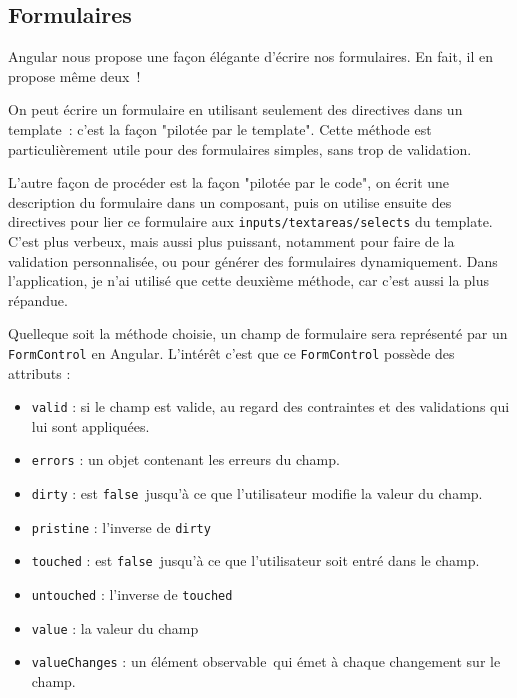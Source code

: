 \subsection{Formulaires}
Angular nous propose une façon élégante d’écrire nos formulaires. En fait, il en propose même deux ! 

On peut écrire un formulaire en utilisant seulement des directives dans un template : c’est la façon "pilotée par le template". Cette méthode est particulièrement utile pour des formulaires simples, sans trop de validation.

L’autre façon de procéder est la façon "pilotée par le code", on écrit une description du formulaire dans un composant, puis on utilise ensuite des directives pour lier ce formulaire aux \texttt{inputs/textareas/selects} du template. C’est plus verbeux, mais aussi plus puissant, notamment pour faire de la validation personnalisée, ou pour générer des formulaires dynamiquement. Dans l'application, je n'ai utilisé que cette deuxième méthode, car c'est aussi la plus répandue.

Quelleque soit la méthode choisie, un champ de formulaire sera représenté par un \texttt{FormControl} en Angular. L'intérêt c'est que ce \texttt{FormControl} possède des attributs :
\begin{itemize}
	\item \texttt{valid} : si le champ est valide, au regard des contraintes et des validations qui lui sont appliquées.
	\item \texttt{errors} : un objet contenant les erreurs du champ.
	\item \texttt{dirty} : est \texttt{false} jusqu’à ce que l’utilisateur modifie la valeur du champ.
	\item \texttt{pristine} : l'inverse de \texttt{dirty}
	\item \texttt{touched} : est \texttt{false} jusqu’à ce que l’utilisateur soit entré dans le champ.
	\item \texttt{untouched} : l'inverse de \texttt{touched}
	\item \texttt{value} : la valeur du champ
	\item \texttt{valueChanges} : un élément observable qui émet à chaque changement sur le champ.
\end{itemize}

